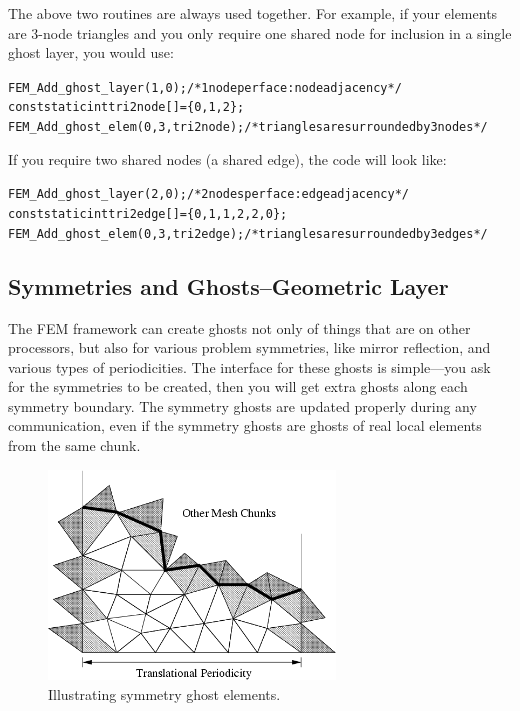 The above two routines are always used together. For example, if your elements are 3-node triangles and you only require one shared node for inclusion in a single ghost layer, you would use:
\begin{alltt}
   FEM\_Add\_ghost\_layer(1,0); /* 1 node per face: node adjacency */
   const static int tri2node[]=\{0,1,2\};
   FEM\_Add\_ghost\_elem(0,3,tri2node); /* triangles are surrounded by 3 nodes */
\end{alltt}

If you require two shared nodes (a shared edge), the code will look like:
\begin{alltt}    
   FEM\_Add\_ghost\_layer(2,0); /* 2 nodes per face: edge adjacency */
   const static int tri2edge[]=\{0,1,  1,2,  2,0\};
   FEM\_Add\_ghost\_elem(0,3,tri2edge); /*triangles are surrounded by 3 edges */
\end{alltt}


\subsection{Symmetries and Ghosts--Geometric Layer}

The FEM framework can create ghosts not only of things that are on other 
processors, but also for various problem symmetries, like mirror reflection,
and various types of periodicities.  The interface for these ghosts is 
simple---you ask for the symmetries to be created, then you will get 
extra ghosts along each symmetry boundary.  The symmetry ghosts are
updated properly during any communication, even if the symmetry ghosts
are ghosts of real local elements from the same chunk.


\begin{figure}[h]
\begin{center}
\includegraphics[width=3in]{fig/sym_ghost}
\end{center}
\caption{Illustrating symmetry ghost elements.}
\label{fig:symghost}
\end{figure}

